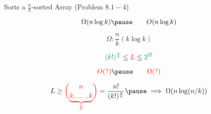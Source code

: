 
\begin{frame}{}
  \begin{exampleblock}{Sorts a $\frac{n}{k}$-sorted Array (Problem $8.1-4$)}

    \pause
    \vspace{-0.50cm}
    \[
      \Omega(n \log k) \pause \qquad O(n \log k)
    \]
  \end{exampleblock}

  \pause
  \vspace{-0.30cm}
  \[
    \Omega: \frac{n}{k} (k \log k)
  \]

  \pause
  \[
    \textcolor{teal}{(k!)^{\frac{n}{k}}} \le \textcolor{red}{L} \le \textcolor{teal}{2^{H}}
  \]
\end{frame}

\begin{frame}{}
  \centerline{}

  \pause
  \vspace{-0.30cm}
  \[
    \red{O(?)} \pause \qquad \red{\Omega(?)}
  \]

  \pause
  \vspace{-0.30cm}
  \[
    L \ge \red{\binom{n}{\underbrace{k, \ldots, k}_{\frac{n}{k}}}} = \frac{n!}{(k!)^{\frac{n}{k}}} \pause \implies \Omega(n \log(n/k))
  \]
\end{frame}
